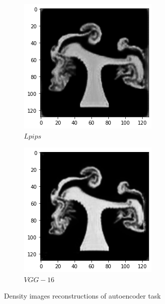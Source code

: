 \documentclass[a4paper,12pt,twoside]{report}
\begin{document}
\begin{figure}
\begin{subfigure}{0.19\textwidth}
	\end{subfigure}
	\begin{subfigure}{0.19\textwidth}
		\centering
		\includegraphics[scale=0.29]{autoencoder/lpips2.png}
		\caption{$Lpips$}
	\end{subfigure}
	\begin{subfigure}{0.19\textwidth}
		\centering
		\includegraphics[scale=0.29]{autoencoder/vgg2.png}
		\caption{$VGG-16$}
	\end{subfigure}
	\caption{Density images reconstructions of autoencoder task}
	\label{autoencoder density outputs}
\end{figure}
\end{document}
